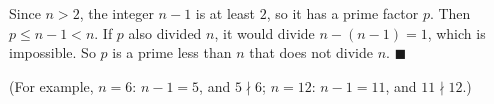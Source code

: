 Since $n>2$, the integer $n-1$ is at least $2$, so it has a prime factor $p$. Then $p\le n-1<n$. If $p$ also divided $n$, it would divide $n-(n-1)=1$, which is impossible. So $p$ is a prime less than $n$ that does not divide $n$. $\blacksquare$

(For example, $n=6$: $n-1=5$, and $5\nmid6$; $n=12$: $n-1=11$, and $11\nmid12$.)
